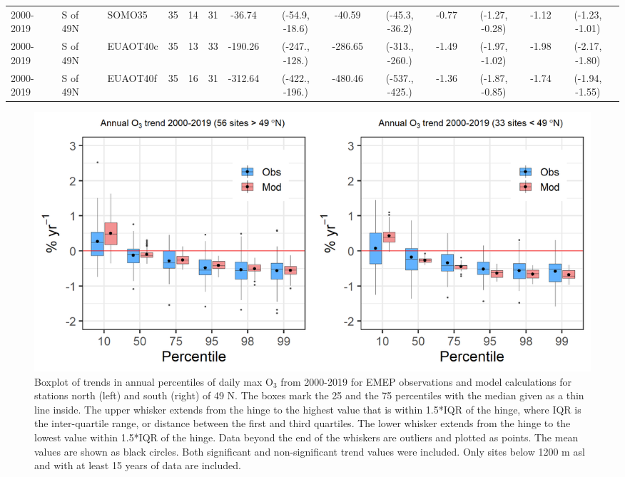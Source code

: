 \begin{table}
\begin{center}
{\begin{tabular}{lll|ccc|cccc|cccc}
2000-2019 & S of 49N & SOMO35 &  35 &  14 &  31 & -36.74 & (-54.9, -18.6) & -40.59 & (-45.3, -36.2) & -0.77 & (-1.27, -0.28) & -1.12 & (-1.23, -1.01) \\
2000-2019 & S of 49N & EUAOT40c &  35 &  13 &  33 & -190.26 & (-247., -128.) & -286.65 & (-313., -260.) & -1.49 & (-1.97, -1.02) & -1.98 & (-2.17, -1.80) \\
2000-2019 & S of 49N & EUAOT40f &  35 &  16 &  31 & -312.64 & (-422., -196.) & -480.46 & (-537., -425.) & -1.36 & (-1.87, -0.85) & -1.74 & (-1.94, -1.55) \\
\bottomrule
\end{tabular}}
\end{center}
\end{table}




\begin{figure}[h]
	\centering
	\includegraphics[width=0.74\paperwidth]{FIGS_TRENDS/O3_boxpl.png}
	\caption{\label{fig:O3_boxplot}Boxplot of trends in annual percentiles of daily max O$_3$ from 2000-2019 for EMEP observations and model calculations for stations north (left) and south (right) of 49 \degrees N. The boxes mark the 25 and the 75 percentiles with the median given as a thin line inside. The upper whisker extends from the hinge to the highest value that is within 1.5*IQR of the hinge, where IQR is the inter-quartile range, or distance between the first and third quartiles. The lower whisker extends from the hinge to the lowest value within 1.5*IQR of the hinge. Data beyond the end of the whiskers are outliers and plotted as points. The mean values are shown as black circles. Both significant and non-significant trend values were included. Only sites below 1200 m asl and with at least 15 years of data are included.}
\end{figure}

